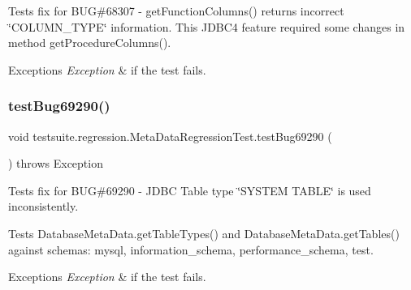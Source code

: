 Tests fix for B\+UG\#68307 -\/ get\+Function\+Columns() returns incorrect \char`\"{}\+C\+O\+L\+U\+M\+N\+\_\+\+T\+Y\+P\+E\char`\"{} information. This J\+D\+B\+C4 feature required some changes in method get\+Procedure\+Columns().


\begin{DoxyExceptions}{Exceptions}
{\em Exception} & if the test fails. \\
\hline
\end{DoxyExceptions}
\mbox{\label{classtestsuite_1_1regression_1_1_meta_data_regression_test_a415c490c795a8501bb347c435a223360}} 
\subsubsection{\texorpdfstring{test\+Bug69290()}{testBug69290()}}
{\footnotesize\ttfamily void testsuite.\+regression.\+Meta\+Data\+Regression\+Test.\+test\+Bug69290 (\begin{DoxyParamCaption}{ }\end{DoxyParamCaption}) throws Exception}

Tests fix for B\+UG\#69290 -\/ J\+D\+BC Table type \char`\"{}\+S\+Y\+S\+T\+E\+M T\+A\+B\+L\+E\char`\"{} is used inconsistently.

Tests Database\+Meta\+Data.\+get\+Table\+Types() and Database\+Meta\+Data.\+get\+Tables() against schemas\+: mysql, information\+\_\+schema, performance\+\_\+schema, test.


\begin{DoxyExceptions}{Exceptions}
{\em Exception} & if the test fails. \\
\hline
\end{DoxyExceptions}
\mbox{\label{classtestsuite_1_1regression_1_1_meta_data_regression_test_a1367bf2ebe3a308c3d374e28648699fc}} 
